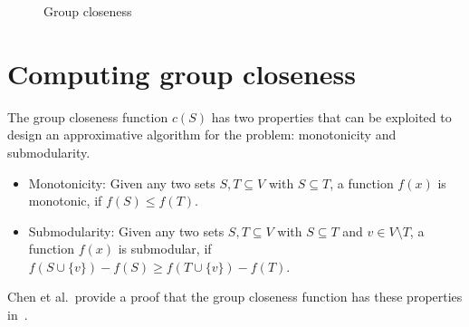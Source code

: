 \begin{figure}[h!]
\centering
{}
\caption{Group closeness}{}
\label{fig:groupCloseness}
\end{figure}

\section{Computing group closeness}
The group closeness function $c(S)$ has two properties that can be exploited to design an approximative algorithm for the problem: monotonicity and submodularity.

\begin{itemize}
	\item Monotonicity: Given any two sets $S, T \subseteq V$ with $S \subseteq T$, a function $f(x)$ is monotonic, if $f(S) \leq f(T)$.
	\item Submodularity: Given any two sets $S, T \subseteq V$ with $S \subseteq T$ and $v \in V \setminus T$, a function $f(x)$ is submodular, if $f(S \cup \{v\}) - f(S) \geq f(T \cup \{v\}) - f(T)$.
\end{itemize}
Chen et al.\ provide a proof that the group closeness function has these properties in~\cite{Chen2016}.

